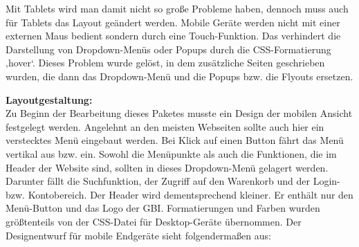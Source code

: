 Mit Tablets wird man damit nicht so große Probleme haben, dennoch muss auch für Tablets das Layout geändert werden. 
Mobile Geräte werden nicht mit einer externen Maus bedient sondern durch eine Touch-Funktion. Das verhindert die Darstellung von Dropdown-Menüs oder Popups durch die CSS-Formatierung ‚hover‘. Dieses Problem wurde gelöst, in dem zusätzliche Seiten geschrieben wurden, die dann das Dropdown-Menü und die Popups bzw. die Flyouts ersetzen.

\newpage
\textbf{Layoutgestaltung:}
\\
Zu Beginn der Bearbeitung dieses Paketes musste ein Design der mobilen Ansicht festgelegt werden. Angelehnt an den meisten Webseiten sollte auch hier ein verstecktes Menü eingebaut werden. Bei Klick auf einen Button fährt das Menü vertikal aus bzw. ein. Sowohl die Menüpunkte als auch die Funktionen, die im Header der Website sind, sollten in dieses Dropdown-Menü gelagert werden. Darunter fällt die Suchfunktion, der Zugriff auf den Warenkorb und der Login- bzw. Kontobereich. Der Header wird dementsprechend kleiner. Er enthält nur den Menü-Button und das Logo der GBI.
Formatierungen und Farben wurden größtenteils von der CSS-Datei für Desktop-Geräte übernommen. 
Der Designentwurf für mobile Endgeräte sieht folgendermaßen aus:

